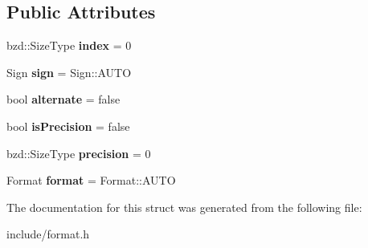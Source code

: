 \subsection*{Public Attributes}
\begin{DoxyCompactItemize}
\item 
\mbox{\label{structbzd_1_1impl_1_1format_1_1Metadata_ac9ee03259e46f6d461509b0ad5ab748f}} 
bzd\+::\+Size\+Type {\bfseries index} = 0
\item 
\mbox{\label{structbzd_1_1impl_1_1format_1_1Metadata_af5eb8c205a837501e83a325c194d0947}} 
Sign {\bfseries sign} = Sign\+::\+A\+U\+TO
\item 
\mbox{\label{structbzd_1_1impl_1_1format_1_1Metadata_adb79b3e31f3a18522cb91b21727c95c4}} 
bool {\bfseries alternate} = false
\item 
\mbox{\label{structbzd_1_1impl_1_1format_1_1Metadata_a2d6fc3c17bd64077fe2fb6fdca5579f1}} 
bool {\bfseries is\+Precision} = false
\item 
\mbox{\label{structbzd_1_1impl_1_1format_1_1Metadata_acb5a73f7cc477f2ed3d751c0e252df29}} 
bzd\+::\+Size\+Type {\bfseries precision} = 0
\item 
\mbox{\label{structbzd_1_1impl_1_1format_1_1Metadata_af3deebdb59fd3a3ad69c545d3721ac1a}} 
Format {\bfseries format} = Format\+::\+A\+U\+TO
\end{DoxyCompactItemize}


The documentation for this struct was generated from the following file\+:\begin{DoxyCompactItemize}
\item 
include/format.\+h\end{DoxyCompactItemize}

